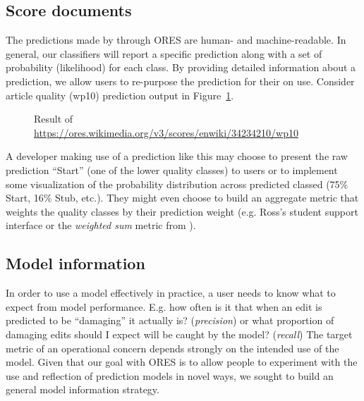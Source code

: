 \subsection{Score documents}
\label{sec:appendix.score_documents}
The predictions made by through ORES are human- and machine-readable.  In general, our classifiers will report a specific prediction along with a set of probability (likelihood) for each class.  By providing detailed information about a prediction, we allow users to re-purpose the prediction for their on use.  Consider article quality (wp10) prediction output in Figure~\ref{fig:english_damaging_model_info}.

\begin{figure}[htbp]
        \caption{Result of \url{https://ores.wikimedia.org/v3/scores/enwiki/34234210/wp10}}
        \label{fig:english_damaging_model_info}
\end{figure}

A developer making use of a prediction like this may choose to present the raw prediction ``Start'' (one of the lower quality classes) to users or to implement some visualization of the probability distribution across predicted classed (75\% Start, 16\% Stub, etc.).  They might even choose to build an aggregate metric that weights the quality classes by their prediction weight (e.g. Ross's student support interface\cite{ross2016visualizing} or the \emph{weighted sum} metric from \cite{halfaker2017interpolating}).

\subsection{Model information}
\label{sec:appendix.model_information}
In order to use a model effectively in practice, a user needs to know what to expect from model performance.  E.g. how often is it that when an edit is predicted to be ``damaging'' it actually is? (\emph{precision}) or what proportion of damaging edits should I expect will be caught by the model? (\emph{recall})  The target metric of an operational concern depends strongly on the intended use of the model.  Given that our goal with ORES is to allow people to experiment with the use and reflection of prediction models in novel ways, we sought to build an general model information strategy.

